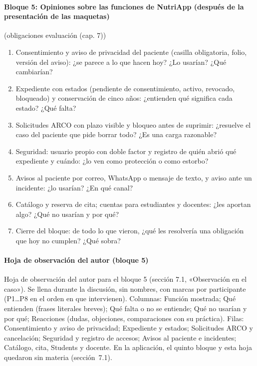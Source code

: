 \documentclass[12pt, a4paper]{article}
\begin{document}
\paragraph{Bloque 5: Opiniones sobre las funciones de NutriApp (después de la presentación de las maquetas)} (obligaciones evaluación (cap. 7))
\begin{enumerate}
  \item Consentimiento y aviso de privacidad del paciente (casilla obligatoria, folio, versión del aviso): ¿se parece a lo que hacen hoy? ¿Lo usarían? ¿Qué cambiarían?
  \item Expediente con estados (pendiente de consentimiento, activo, revocado, bloqueado) y conservación de cinco años: ¿entienden qué significa cada estado? ¿Qué falta?
  \item Solicitudes ARCO con plazo visible y bloqueo antes de suprimir: ¿resuelve el caso del paciente que pide borrar todo? ¿Es una carga razonable?
  \item Seguridad: usuario propio con doble factor y registro de quién abrió qué expediente y cuándo: ¿lo ven como protección o como estorbo?
  \item Avisos al paciente por correo, Whats\-App o mensaje de texto, y aviso ante un incidente: ¿lo usarían? ¿En qué canal?
  \item Catálogo y reserva de cita; cuentas para estudiantes y docentes: ¿les aportan algo? ¿Qué no usarían y por qué?
  \item Cierre del bloque: de todo lo que vieron, ¿qué les resolvería una obligación que hoy no cumplen? ¿Qué sobra?
\end{enumerate}
 
\paragraph{Hoja de observación del autor (bloque 5)}
Hoja de observación del autor para el bloque 5 (sección 7.1, «Observación en el caso»). Se llena durante la discusión, sin nombres, con marcas por participante (P1…P8 en el orden en que intervienen).
Columnas: Función mostrada; Qué entienden (frases literales breves); Qué falta o no se entiende; Qué no usarían y por qué; Reacciones (dudas, objeciones, comparaciones con su práctica). Filas: Consentimiento y aviso de privacidad; Expediente y estados; Solicitudes ARCO y cancelación; Seguridad y registro de accesos; Avisos al paciente e incidentes; Catálogo, cita, Students y docente. En la aplicación, el quinto bloque y esta hoja quedaron sin materia (sección~7.1).
 
\end{document}
